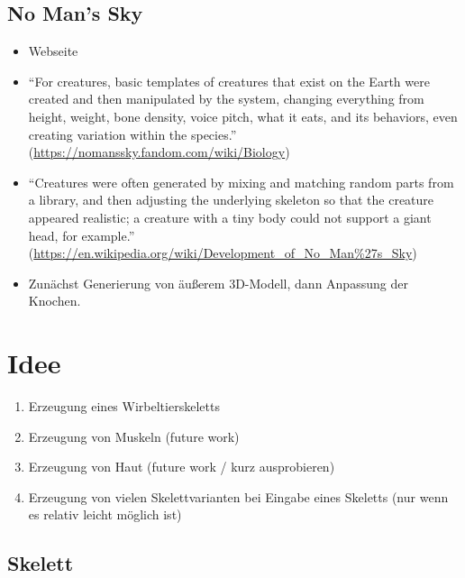 \section{No Man's Sky}

\begin{itemize}
 \item Webseite \cite{NoMansSky}
 \item "`For creatures, basic templates of creatures that exist on the Earth were created and then manipulated by the system, changing everything from height, weight, bone density, voice pitch, what it eats, and its behaviors, even creating variation within the species."' (\url{https://nomanssky.fandom.com/wiki/Biology})
 \item "`Creatures were often generated by mixing and matching random parts from a library, and then adjusting the underlying skeleton so that the creature appeared realistic; a creature with a tiny body could not support a giant head, for example."' (\url{https://en.wikipedia.org/wiki/Development_of_No_Man\%27s_Sky})
 \item Zunächst Generierung von äußerem 3D-Modell, dann Anpassung der Knochen.
\end{itemize}


\chapter{Idee}

\begin{enumerate}
 \item Erzeugung eines Wirbeltierskeletts
 \item Erzeugung von Muskeln (future work)
 \item Erzeugung von Haut (future work / kurz ausprobieren)
 \item Erzeugung von vielen Skelettvarianten bei Eingabe eines Skeletts (nur wenn es relativ leicht möglich ist)
\end{enumerate}

\section{Skelett}

